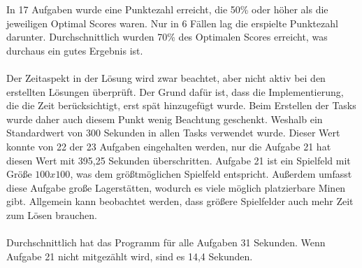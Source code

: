 In 17 Aufgaben wurde eine Punktezahl erreicht, die 50\% oder höher als die jeweiligen Optimal Scores waren. Nur in 6 Fällen lag die erspielte Punktezahl darunter. Durchschnittlich wurden 70\% des Optimalen Scores erreicht, was durchaus ein gutes Ergebnis ist.
\\\\
Der Zeitaspekt in der Lösung wird zwar beachtet, aber nicht aktiv bei den erstellten Lösungen überprüft. Der Grund dafür ist, dass die Implementierung, die die Zeit berücksichtigt, erst spät hinzugefügt wurde. Beim Erstellen der Tasks wurde daher auch diesem Punkt wenig Beachtung geschenkt. Weshalb ein Standardwert von 300 Sekunden in allen Tasks verwendet wurde. Dieser Wert konnte von 22 der 23 Aufgaben eingehalten werden, nur die Aufgabe 21 hat diesen Wert mit 395,25 Sekunden überschritten. 
Aufgabe 21 ist ein Spielfeld mit Größe $100 x 100$, was dem größtmöglichen Spielfeld entspricht. Außerdem umfasst diese Aufgabe große Lagerstätten, wodurch es viele möglich platzierbare Minen gibt. Allgemein kann beobachtet werden, dass größere Spielfelder auch mehr Zeit zum Lösen brauchen. 
\\\\
Durchschnittlich hat das Programm für alle Aufgaben 31 Sekunden. Wenn Aufgabe 21 nicht mitgezählt wird, sind es 14,4 Sekunden. 













